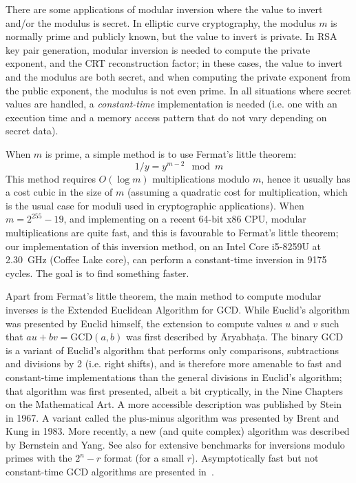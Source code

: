 \documentclass{llncs}
\begin{document}
There are some applications of modular inversion where the value to
invert and/or the modulus is secret. In elliptic curve cryptography, the
modulus $m$ is normally prime and publicly known, but the value to
invert is private. In RSA key pair generation, modular inversion is
needed to compute the private exponent, and the CRT reconstruction
factor; in these cases, the value to invert and the modulus are both
secret, and when computing the private exponent from the public
exponent, the modulus is not even prime. In all situations where secret
values are handled, a \emph{constant-time} implementation is needed
(i.e. one with an execution time and a memory access pattern that
do not vary depending on secret data).

When $m$ is prime, a simple method is to use Fermat's little theorem:
\begin{equation*}
    1/y = y^{m-2} \mod m
\end{equation*}
This method requires $O(\log m)$ multiplications modulo $m$, hence it
usually has a cost cubic in the size of $m$ (assuming a quadratic cost
for multiplication, which is the usual case for moduli used in
cryptographic applications). When $m = 2^{255}-19$, and implementing on
a recent 64-bit x86 CPU, modular multiplications are quite fast, and
this is favourable to Fermat's little theorem; our implementation of
this inversion method, on an Intel Core i5-8259U at 2.30~GHz (Coffee
Lake core), can perform a constant-time inversion in 9175 cycles. The
goal is to find something faster.

Apart from Fermat's little theorem, the main method to compute modular
inverses is the Extended Euclidean Algorithm for GCD. While Euclid's
algorithm was presented by Euclid himself\cite{Euc300BC}, the extension
to compute values $u$ and $v$ such that $au + bv = \text{GCD}(a,b)$ was
first described by \={A}ryabha\d{t}a\cite{Ary499}. The binary GCD is a
variant of Euclid's algorithm that performs only comparisons,
subtractions and divisions by 2 (i.e. right shifts), and is therefore
more amenable to fast and constant-time implementations than the general
divisions in Euclid's algorithm; that algorithm was first presented,
albeit a bit cryptically, in the Nine Chapters on the Mathematical
Art\cite{Chi1}. A more accessible description was published by Stein in
1967\cite{Ste1967}. A variant called the plus-minus algorithm was
presented by Brent and Kung in 1983\cite{BreKun1983}. More recently, a
new (and quite complex) algorithm was described by Bernstein and
Yang\cite{BerYan2019}. See also \cite{NatSar2018} for extensive
benchmarks for inversions modulo primes with the $2^n - r$ format (for a
small $r$). Asymptotically fast but not constant-time GCD algorithms are
presented in~\cite{Mol2008}.
\end{document}
